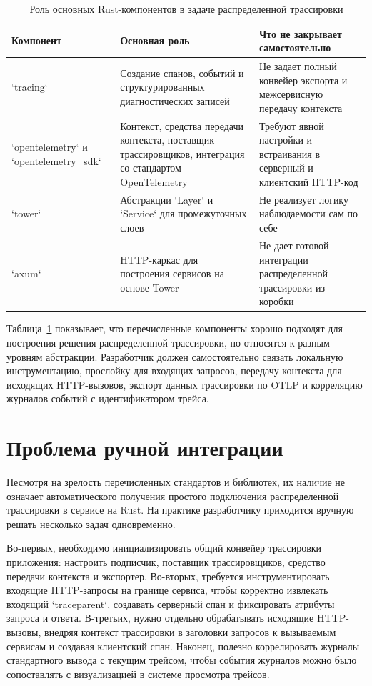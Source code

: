 \begin{table}[H]
    \centering
    \caption{Роль основных Rust-компонентов в задаче распределенной трассировки}
    \label{tab:rust-components}
    \renewcommand{\arraystretch}{1.2}
    \begin{tabularx}{\textwidth}{>{\raggedright\arraybackslash}p{2.7cm} >{\raggedright\arraybackslash}X >{\raggedright\arraybackslash}X}
        \toprule
        Компонент & Основная роль & Что не закрывает самостоятельно \\
        \midrule
        `tracing` & Создание спанов, событий и структурированных диагностических записей & Не задает полный конвейер экспорта и межсервисную передачу контекста \\
        \addlinespace
        `opentelemetry` и `opentelemetry\_sdk` & Контекст, средства передачи контекста, поставщик трассировщиков, интеграция со стандартом OpenTelemetry & Требуют явной настройки и встраивания в серверный и клиентский HTTP-код \\
        \addlinespace
        `tower` & Абстракции `Layer` и `Service` для промежуточных слоев & Не реализует логику наблюдаемости сам по себе \\
        \addlinespace
        `axum` & HTTP-каркас для построения сервисов на основе Tower & Не дает готовой интеграции распределенной трассировки из коробки \\
        \bottomrule
    \end{tabularx}
\end{table}

Таблица~\ref{tab:rust-components} показывает, что перечисленные компоненты хорошо
подходят для построения решения распределенной трассировки, но относятся к разным
уровням абстракции. Разработчик должен самостоятельно связать локальную
инструментацию, прослойку для входящих запросов, передачу контекста для исходящих
HTTP-вызовов, экспорт данных трассировки по OTLP и корреляцию журналов событий с
идентификатором трейса.

\section{Проблема ручной интеграции}

Несмотря на зрелость перечисленных стандартов и библиотек, их наличие не означает
автоматического получения простого подключения распределенной трассировки в
сервисе на Rust. На практике разработчику приходится вручную решать несколько
задач одновременно.

Во-первых, необходимо инициализировать общий конвейер трассировки приложения:
настроить подписчик, поставщик трассировщиков, средство передачи контекста и
экспортер. Во-вторых, требуется инструментировать входящие HTTP-запросы на
границе сервиса, чтобы корректно извлекать входящий `traceparent`, создавать
серверный спан и фиксировать атрибуты запроса и ответа. В-третьих, нужно отдельно
обрабатывать исходящие HTTP-вызовы, внедряя контекст трассировки в заголовки
запросов к вызываемым сервисам и создавая клиентский спан. Наконец, полезно
коррелировать журналы стандартного вывода с текущим трейсом, чтобы события
журналов можно было сопоставлять с визуализацией в системе просмотра трейсов.

